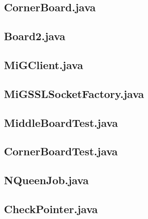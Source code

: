 \begin{landscape}
\subsection{CornerBoard.java}\label{cornerboard}

\subsection{Board2.java}\label{board2}

\subsection{MiGClient.java}\label{migclient}

\subsection{MiGSSLSocketFactory.java}\label{migsslsocketfactory}

\subsection{MiddleBoardTest.java}\label{middleboardtest}

\subsection{CornerBoardTest.java}\label{cornerboardtest}

\subsection{NQueenJob.java}\label{nqueenjob}

\subsection{CheckPointer.java}\label{checkpointer}


\end{landscape}
